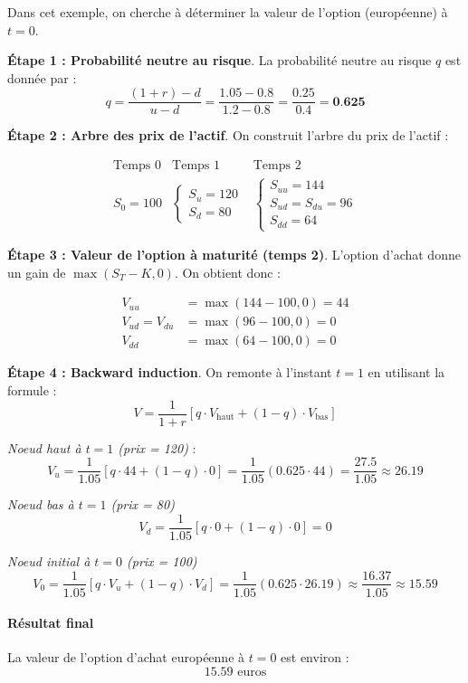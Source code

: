 \documentclass[12pt,a4paper]{article}
\begin{document}
Dans cet exemple, on cherche à déterminer la valeur de l'option (européenne) à \(t = 0\).

\noindent \textbf{Étape 1 : Probabilité neutre au risque}. La probabilité neutre au risque $q$ est donnée par :
\[
q = \frac{(1 + r) - d}{u - d} = \frac{1.05 - 0.8}{1.2 - 0.8} = \frac{0.25}{0.4} = \textbf{0.625}
\]

\noindent \textbf{Étape 2 : Arbre des prix de l’actif}. On construit l’arbre du prix de l’actif :

\[
\begin{array}{ccc}
\text{Temps 0} & \text{Temps 1} & \text{Temps 2} \\
S_0 = 100 & \begin{cases}
S_u = 120 \\
S_d = 80
\end{cases}
&
\begin{cases}
S_{uu} = 144 \\
S_{ud} = S_{du} = 96 \\
S_{dd} = 64
\end{cases}
\end{array}
\]

\noindent \textbf{Étape 3 : Valeur de l’option à maturité (temps 2)}. L’option d’achat donne un gain de $\max(S_T - K, 0)$. On obtient donc :

\[
\begin{aligned}
V_{uu} &= \max(144 - 100, 0) = 44 \\
V_{ud} = V_{du} &= \max(96 - 100, 0) = 0 \\
V_{dd} &= \max(64 - 100, 0) = 0
\end{aligned}
\]

\noindent \textbf{Étape 4 : Backward induction}. On remonte à l’instant $t=1$ en utilisant la formule :
\[
V = \frac{1}{1 + r} \left[ q \cdot V_\text{haut} + (1 - q) \cdot V_\text{bas} \right]
\]

\textit{Noeud haut à $t=1$ (prix = 120)} :
\[
V_u = \frac{1}{1.05} \left[ q \cdot 44 + (1 - q) \cdot 0 \right] = \frac{1}{1.05} (0.625 \cdot 44) = \frac{27.5}{1.05} \approx 26.19
\]

\textit{Noeud bas à $t=1$ (prix = 80)}
\[
V_d = \frac{1}{1.05} \left[ q \cdot 0 + (1 - q) \cdot 0 \right] = 0
\]

\textit{Noeud initial à $t=0$ (prix = 100)}
\[
V_0 = \frac{1}{1.05} \left[ q \cdot V_u + (1 - q) \cdot V_d \right] = \frac{1}{1.05} (0.625 \cdot 26.19) \approx \frac{16.37}{1.05} \approx 15.59
\]

\paragraph{Résultat final} La valeur de l’option d’achat européenne à $t=0$ est environ :
\[\boxed{15.59 \text{ euros}}\]
\end{document}
